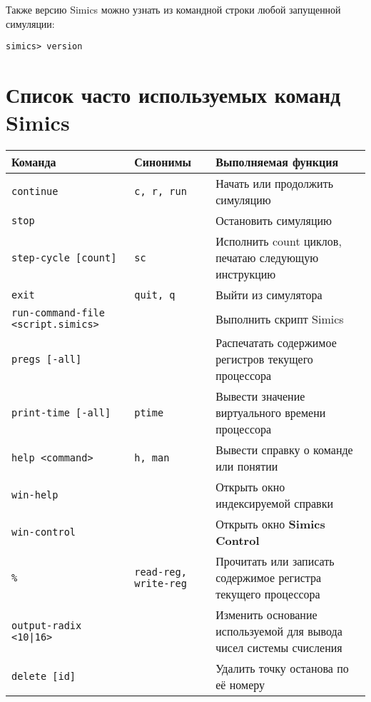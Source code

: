 Также версию Simics можно узнать из командной строки любой запущенной симуляции:

\begin{lstlisting}
simics> version
\end{lstlisting}

\section{Список часто используемых команд Simics}

\begin{center}
\begin{tabularx}{\textwidth}{|X|X|p{}|}\hline
\textbf{Команда}                          & \textbf{Синонимы}  & \textbf{Выполняемая функция}\\\hline
\texttt{continue}                         & \texttt{c, r, run} & Начать или продолжить симуляцию\\\hline
\texttt{stop}                             &                    & Остановить симуляцию\\\hline
\texttt{step-cycle [count]}               & \texttt{sc}        & Исполнить count циклов, печатаю следующую инструкцию\\\hline
\texttt{exit}                             & \texttt{quit, q}   & Выйти из симулятора\\\hline
\texttt{run-command-file <script.simics>} &                    & Выполнить скрипт Simics\\\hline
\texttt{pregs [-all]}                     &                    & Распечатать содержимое регистров текущего процессора\\\hline
\texttt{print-time [-all]}                & \texttt{ptime}     & Вывести значение виртуального времени процессора\\\hline
\texttt{help <command>}                   & \texttt{h, man}    & Вывести справку о команде или понятии \\\hline
\texttt{win-help}                         &                    & Открыть окно индексируемой справки \\\hline
\texttt{win-control}                      &                    & Открыть окно \textbf{Simics Control}\\\hline
\texttt{\%<register name>}                & \texttt{read-reg, write-reg} & Прочитать или записать содержимое регистра текущего процессора \\\hline
\texttt{output-radix <10|16>}             &                    & Изменить основание используемой для вывода чисел системы счисления\\\hline
\texttt{delete [id]}                      &                    & Удалить точку останова по её номеру \\\hline
\end{tabularx}

\end{center}



